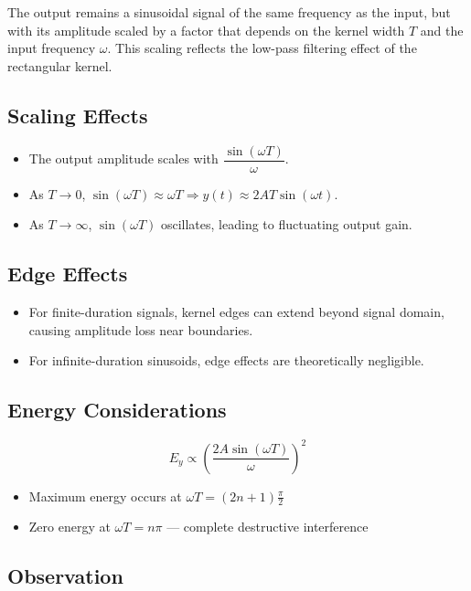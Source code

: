 \documentclass[12pt,a4paper]{report}
\begin{document}
The output remains a sinusoidal signal of the same frequency as the input, but with its amplitude scaled by a factor that depends on the kernel width \( T \) and the input frequency \( \omega \). This scaling reflects the low-pass filtering effect of the rectangular kernel.



\subsection{Scaling Effects}

\begin{itemize}
    \item The output amplitude scales with \( \dfrac{\sin(\omega T)}{\omega} \).
    \item As \( T \to 0 \), \( \sin(\omega T) \approx \omega T \Rightarrow y(t) \approx 2A T \sin(\omega t) \).
    \item As \( T \to \infty \), \( \sin(\omega T) \) oscillates, leading to fluctuating output gain.
\end{itemize}

\subsection{Edge Effects}

\begin{itemize}
    \item For finite-duration signals, kernel edges can extend beyond signal domain, causing amplitude loss near boundaries.
    \item For infinite-duration sinusoids, edge effects are theoretically negligible.
\end{itemize}
\subsection{Energy Considerations}

\[
E_y \propto \left( \frac{2A \sin(\omega T)}{\omega} \right)^2
\]

\begin{itemize}
    \item Maximum energy occurs at \( \omega T = (2n+1)\frac{\pi}{2} \)
    \item Zero energy at \( \omega T = n\pi \) — complete destructive interference
\end{itemize}

\subsection{Observation}
\end{document}

